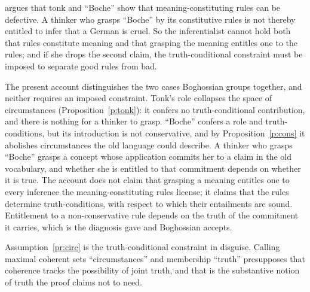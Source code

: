 \documentclass{situationist-preprint}
\begin{document}
\begin{objection}\label{o:bog}
\citet{Boghossian2003} argues that tonk and \enquote{Boche} show that meaning-constituting rules can be defective. A thinker who grasps \enquote{Boche} by its constitutive rules is not thereby entitled to infer that a German is cruel. So the inferentialist cannot hold both that rules constitute meaning and that grasping the meaning entitles one to the rules; and if she drops the second claim, the truth-conditional constraint must be imposed to separate good rules from bad.
\end{objection}

\begin{reply}
The present account distinguishes the two cases Boghossian groups together, and neither requires an imposed constraint. Tonk's role collapses the space of circumstances (Proposition~\ref{p:tonk}): it confers no truth-conditional contribution, and there is nothing for a thinker to grasp. \enquote{Boche} confers a role and truth-conditions, but its introduction is not conservative, and by Proposition~\ref{p:cons} it abolishes circumstances the old language could describe. A thinker who grasps \enquote{Boche} grasps a concept whose application commits her to a claim in the old vocabulary, and whether she is entitled to that commitment depends on whether it is true. The account does not claim that grasping a meaning entitles one to every inference the meaning-constituting rules license; it claims that the rules determine truth-conditions, with respect to which their entailments are sound. Entitlement to a non-conservative rule depends on the truth of the commitment it carries, which is the diagnosis \citet{Dummett1973} gave and Boghossian accepts.
\end{reply}

\begin{objection}[Circularity]\label{o:circ}
Assumption~\ref{pr:circ} is the truth-conditional constraint in disguise. Calling maximal coherent sets \enquote{circumstances} and membership \enquote{truth} presupposes that coherence tracks the possibility of joint truth, and that is the substantive notion of truth the proof claims not to need.
\end{objection}
\end{document}
